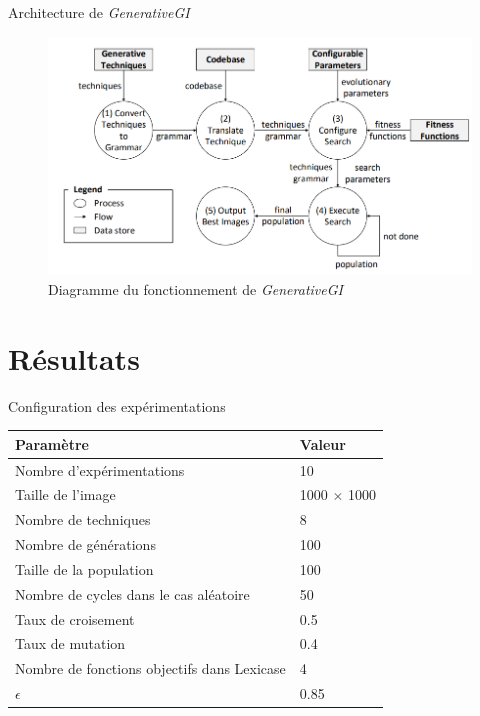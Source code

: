 \documentclass[aspectratio=169]{beamer}
\begin{document}
\begin{frame}{Architecture de \textit{GenerativeGI}}
    \begin{figure}
        \centering
        \includegraphics[scale=0.4]{fig/archi.png}
        \caption{Diagramme du fonctionnement de \textit{GenerativeGI}}
    \end{figure}
\end{frame}

\section{Résultats}

\begin{frame}{Configuration des expérimentations}
    \begin{table}[]
        \begin{tabular}{|l|l|}
            \hline
            \textbf{Paramètre}                          & \textbf{Valeur}    \\ \hline
            Nombre d'expérimentations                   & 10                 \\ \hline
            Taille de l'image                           & 1000 $\times$ 1000 \\ \hline
            Nombre de techniques                        & 8                  \\ \hline
            Nombre de générations                       & 100                \\ \hline
            Taille de la population                     & 100                \\ \hline
            Nombre de cycles dans le cas aléatoire      & 50                 \\ \hline
            Taux de croisement                          & 0.5                \\ \hline
            Taux de mutation                            & 0.4                \\ \hline
            Nombre de fonctions objectifs dans Lexicase & 4                  \\ \hline
            $\epsilon$                                  & 0.85               \\ \hline
        \end{tabular}
    \end{table}
\end{frame}
\end{document}
